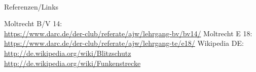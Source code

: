 \renewcommand{\refname}{Referenzen}

\hypertarget{refs}{}
\textcolor{white}{} \\ %
\Large Referenzen/Links
\footnotesize

\begin{thebibliography}{}
    Moltrecht B/V 14: \\
    \url{https://www.darc.de/der-club/referate/ajw/lehrgang-bv/bv14/}
     Moltrecht E 18: \\
    \url{https://www.darc.de/der-club/referate/ajw/lehrgang-te/e18/}
      Wikipedia DE: \\
    \url{http://de.wikipedia.org/wiki/Blitzschutz}\\
    \url{http://de.wikipedia.org/wiki/Funkenstrecke}\\
\end{thebibliography}


